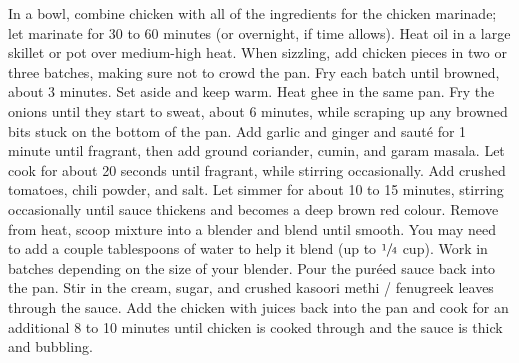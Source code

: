 \begin{recipe}
    \preparation
    {
        \step In a bowl, combine chicken with all of the ingredients for the chicken marinade; let marinate for 30 to 60 minutes (or overnight, if time allows).
		\step Heat oil in a large skillet or pot over medium-high heat. When sizzling, add chicken pieces in two or three batches, making sure not to crowd the pan. Fry each batch until browned, about 3 minutes. Set aside and keep warm. 
		\step Heat ghee in the same pan. Fry the onions until they start to sweat, about 6 minutes, while scraping up any browned bits stuck on the bottom of the pan. 
		\step Add garlic and ginger and saut\'e for 1 minute until fragrant, then add ground coriander, cumin, and garam masala. Let cook for about 20 seconds until fragrant, while stirring occasionally. 
		\step Add crushed tomatoes, chili powder, and salt. Let simmer for about 10 to 15 minutes, stirring occasionally until sauce thickens and becomes a deep brown red colour. 
		\step Remove from heat, scoop mixture into a blender and blend until smooth. You may need to add a couple tablespoons of water to help it blend (up to $\sfrac{1}{4}$ cup). Work in batches depending on the size of your blender.
		\step Pour the pur\'eed sauce back into the pan. Stir in the cream, sugar, and crushed kasoori methi / fenugreek leaves through the sauce. 
		\step Add the chicken with juices back into the pan and cook for an additional 8 to 10 minutes until chicken is cooked through and the sauce is thick and bubbling. 
    }
	


\end{recipe}
